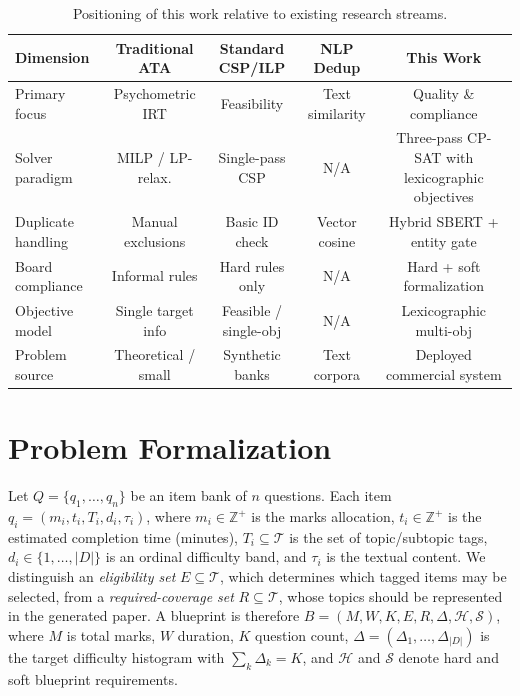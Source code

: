 \documentclass[runningheads]{llncs}
\begin{document}
\begin{table}[t]
\caption{Positioning of this work relative to existing research streams.}
\label{tab:positioning}
\centering
\scriptsize
\begin{tabular}{lcccc}
\toprule
\textbf{Dimension} & \textbf{Traditional ATA} & \textbf{Standard CSP/ILP} & \textbf{NLP Dedup} & \textbf{This Work} \\
\midrule
Primary focus & Psychometric IRT & Feasibility & Text similarity & Quality \& compliance \\
Solver paradigm & MILP / LP-relax. & Single-pass CSP & N/A & Three-pass CP-SAT with lexicographic objectives \\
Duplicate handling & Manual exclusions & Basic ID check & Vector cosine & Hybrid SBERT + entity gate \\
Board compliance & Informal rules & Hard rules only & N/A & Hard + soft formalization \\
Objective model & Single target info & Feasible / single-obj & N/A & Lexicographic multi-obj \\
Problem source & Theoretical / small & Synthetic banks & Text corpora & Deployed commercial system \\
\bottomrule
\end{tabular}
\end{table}

\section{Problem Formalization}
\label{sec:formalization}

Let $Q=\{q_1,\dots,q_n\}$ be an item bank of $n$ questions.
Each item $q_i=(m_i,t_i,T_i,d_i,\tau_i)$, where $m_i\in\mathbb{Z}^+$ is the marks allocation, $t_i\in\mathbb{Z}^+$ is the estimated completion time (minutes), $T_i\subseteq\mathcal{T}$ is the set of topic/subtopic tags, $d_i\in\{1,\dots,|D|\}$ is an ordinal difficulty band, and $\tau_i$ is the textual content.
We distinguish an \emph{eligibility set} $E\subseteq\mathcal{T}$, which determines which tagged items may be selected, from a \emph{required-coverage set} $R\subseteq\mathcal{T}$, whose topics should be represented in the generated paper.
A blueprint is therefore $B=(M,W,K,E,R,\Delta,\mathcal{H},\mathcal{S})$, where $M$ is total marks, $W$ duration, $K$ question count, $\Delta=(\Delta_1,\dots,\Delta_{|D|})$ is the target difficulty histogram with $\sum_k\Delta_k=K$, and $\mathcal{H}$ and $\mathcal{S}$ denote hard and soft blueprint requirements.
\end{document}
